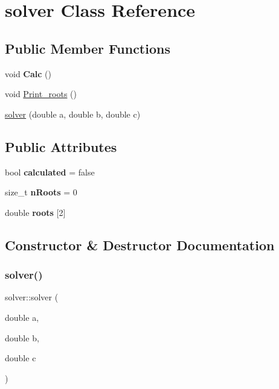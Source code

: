 \hypertarget{classsolver}{}\section{solver Class Reference}
\label{classsolver}
\subsection*{Public Member Functions}
\begin{DoxyCompactItemize}
\item 
\mbox{\label{classsolver_a6c53936b4d3f14c00e900b5d62b0bc48}} 
void {\bfseries Calc} ()
\item 
void \mbox{\hyperlink{classsolver_a8a6dab24178576aab71e67bf5b95bf0f}{Print\+\_\+roots}} ()
\item 
\mbox{\hyperlink{classsolver_a3273bce3a40c342669b59fe193d09879}{solver}} (double a, double b, double c)
\end{DoxyCompactItemize}
\subsection*{Public Attributes}
\begin{DoxyCompactItemize}
\item 
\mbox{\label{classsolver_a2b9a50fb912fcde4d4878e360ebbc0e6}} 
bool {\bfseries calculated} = false
\item 
\mbox{\label{classsolver_ab7904b8b6abce92d1f68a4533d6f2352}} 
size\+\_\+t {\bfseries n\+Roots} = 0
\item 
\mbox{\label{classsolver_ad9f76bae6c17eba80442618016a95d57}} 
double {\bfseries roots} \mbox{[}2\mbox{]}
\end{DoxyCompactItemize}


\subsection{Constructor \& Destructor Documentation}
\mbox{\label{classsolver_a3273bce3a40c342669b59fe193d09879}} 
\subsubsection{\texorpdfstring{solver()}{solver()}}
{\footnotesize\ttfamily solver\+::solver (\begin{DoxyParamCaption}\item[{double}]{a,  }\item[{double}]{b,  }\item[{double}]{c }\end{DoxyParamCaption})}

